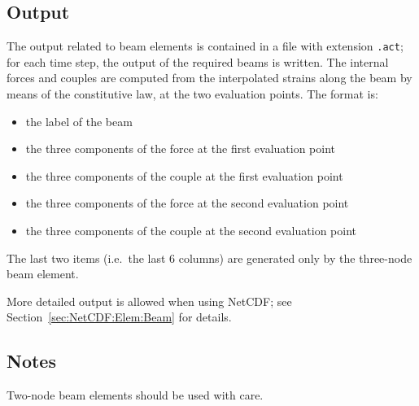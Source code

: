 \subsection{Output}
The output related to beam elements is contained in a file with extension 
\texttt{.act}; for each time step, the output of the required beams is
written.
The internal forces and couples are computed from the interpolated strains
along the beam by means of the constitutive law, at the two evaluation
points. 
The format is:
\begin{itemize}
    \item the label of the beam
    \item the three components of the force at the first evaluation point
    \item the three components of the couple at the first evaluation point
    \item the three components of the force at the second evaluation point
    \item the three components of the couple at the second evaluation point    
\end{itemize}
The last two items (i.e.\ the last 6 columns) are generated
only by the three-node beam element.

More detailed output is allowed when using NetCDF;
see Section~\ref{sec:NetCDF:Elem:Beam} for details.



\subsection{Notes}
Two-node beam elements should be used with care.
